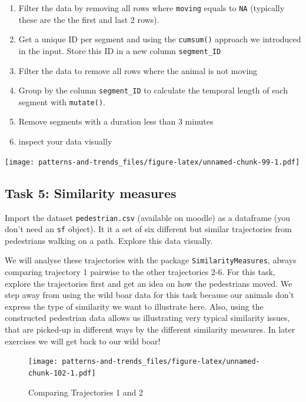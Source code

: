 \documentclass[]{book}
\providecommand{\tightlist}{%
  \setlength{\itemsep}{0pt}\setlength{\parskip}{0pt}}
\begin{document}
\begin{enumerate}
\def\labelenumi{\arabic{enumi}.}
\tightlist
\item
  Filter the data by removing all rows where \texttt{moving} equals to \texttt{NA} (typically these are the the first and last 2 rows).
\item
  Get a unique ID per segment and using the \texttt{cumsum()} approach we introduced in the input. Store this ID in a new column \texttt{segment\_ID}
\item
  Filter the data to remove all rows where the animal is not moving
\item
  Group by the column \texttt{segment\_ID} to calculate the temporal length of each segment with \texttt{mutate()}.
\item
  Remove segments with a duration less than 3 minutes
\item
  inspect your data visually
\end{enumerate}

\texttt{[image: patterns-and-trends\_files/figure-latex/unnamed-chunk-99-1.pdf]}

\hypertarget{task-5-similarity-measures}{%
\subsection{Task 5: Similarity measures}\label{task-5-similarity-measures}}

Import the dataset \texttt{pedestrian.csv} (available on moodle) as a dataframe (you don't need an \texttt{sf} object). It it a set of six different but similar trajectories from pedestrians walking on a path. Explore this data visually.

We will analyse these trajectories with the package \texttt{SimilarityMeasures}, always comparing trajectory 1 pairwise to the other trajectories 2-6. For this task, explore the trajectories first and get an idea on how the pedestrians moved. We step away from using the wild boar data for this task because our animals don't express the type of similarity we want to illustrate here. Also, using the constructed pedestrian data allows us illustrating very typical similarity issues, that are picked-up in different ways by the different similarity measures. In later exercises we will get back to our wild boar!

\begin{figure}
\centering
\texttt{[image: patterns-and-trends\_files/figure-latex/unnamed-chunk-102-1.pdf]}
\caption{\label{fig:unnamed-chunk-102}Comparing Trajectories 1 and 2}
\end{figure}
\end{document}
